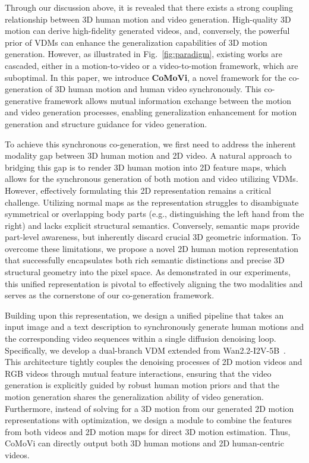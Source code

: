 Through our discussion above, it is revealed that there exists a strong coupling relationship between 3D human motion and video generation. High-quality 3D motion can derive high-fidelity generated videos, and, conversely, the powerful prior of VDMs can enhance the generalization capabilities of 3D motion generation. However, as illustrated in Fig.~\ref{fig:paradigm}, existing works are cascaded, either in a motion-to-video or a video-to-motion framework, which are suboptimal. In this paper, we introduce \textbf{CoMoVi}, a novel framework for the co-generation of 3D human motion and human video synchronously. This co-generative framework allows mutual information exchange between the motion and video generation processes, enabling generalization enhancement for motion generation and structure guidance for video generation.

To achieve this synchronous co-generation, we first need to address the inherent modality gap between 3D human motion and 2D video. A natural approach to bridging this gap is to render 3D human motion into 2D feature maps, which allows for the synchronous generation of both motion and video utilizing VDMs. However, effectively formulating this 2D representation remains a critical challenge. Utilizing normal maps as the representation struggles to disambiguate symmetrical or overlapping body parts (e.g., distinguishing the left hand from the right) and lacks explicit structural semantics. Conversely, semantic maps provide part-level awareness, but inherently discard crucial 3D geometric information. To overcome these limitations, we propose a novel 2D human motion representation that successfully encapsulates both rich semantic distinctions and precise 3D structural geometry into the pixel space. As demonstrated in our experiments, this unified representation is pivotal to effectively aligning the two modalities and serves as the cornerstone of our co-generation framework.

Building upon this representation, we design a unified pipeline that takes an input image and a text description to synchronously generate human motions and the corresponding video sequences within a single diffusion denoising loop. Specifically, we develop a dual-branch VDM extended from Wan2.2-I2V-5B~\cite{wan2025wan}. This architecture tightly couples the denoising processes of 2D motion videos and RGB videos through mutual feature interactions, ensuring that the video generation is explicitly guided by robust human motion priors and that the motion generation shares the generalization ability of video generation. 
Furthermore, instead of solving for a 3D motion from our generated 2D motion representations with optimization, we design a module to combine the features from both videos and 2D motion maps for direct 3D motion estimation. Thus, CoMoVi can directly output both 3D human motions and 2D human-centric videos.

